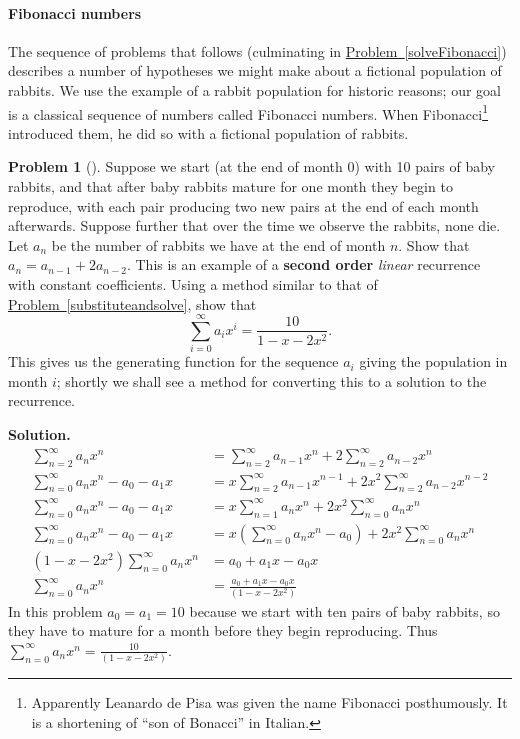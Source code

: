 \documentclass[10pt,]{book}
\newcommand{\terminology}[1]{\textbf{#1}}
\theoremstyle{plain}
\theoremstyle{definition}
\newtheorem{activity}[project]{Problem}
\theoremstyle{definition}
\numberwithin{equation}{chapter}
\newcommand{\amp}{&}
\begin{document}
\paragraph[{Fibonacci numbers}]{Fibonacci numbers}\hypertarget{paragraphs-7}{}
The sequence of problems that follows (culminating in \hyperref[solveFibonacci]{Problem~\ref{solveFibonacci}}) describes a number of hypotheses we might make about a fictional population of rabbits. We use the example of a rabbit population for historic reasons; our goal is a classical sequence of numbers called Fibonacci numbers. When Fibonacci\footnote{Apparently Leanardo de Pisa was given the name Fibonacci posthumously. It is a shortening of ``son of Bonacci'' in Italian.\label{fn-14}} introduced them, he did so with a fictional population of rabbits.%
\begin{activity}[]\label{secondorderintroduction}
Suppose we start (at the end of month 0) with 10 pairs of baby rabbits, and that after baby rabbits mature for one month they begin to reproduce, with each pair producing two new pairs at the end of each month afterwards. Suppose further that over the time we observe the rabbits, none die. Let \(a_n\) be the number of rabbits we have at the end of month \(n\). Show that \(a_n=a_{n-1} + 2a_{n-2}\). This is an example of a \terminology{second order} \emph{linear} recurrence with constant coefficients. Using a method similar to that of \hyperref[substituteandsolve]{Problem~\ref{substituteandsolve}}, show that%
\begin{equation*}
\sum_{i=0}^\infty a_ix^i = \frac{10}{1-x-2x^2}.
\end{equation*}
This gives us the generating function for the sequence \(a_i\) giving the population in month \(i\); shortly we shall see a method for converting this to a solution to the recurrence.%
\par\medskip\noindent%
\textbf{Solution.}\quad %
\begin{align*}
\sum_{n=2}^\infty a_nx^n \amp= \sum_{n=2}^\infty a_{n-1}x^n +
2\sum_{n=2}^\infty a_{n-2}x^n\\
\sum_{n=0}^\infty a_nx^n -a_0-a_1x  \amp= x\sum_{n=2}^\infty a_{n-1}x^{n-1} +
2x^2\sum_{n=2}^\infty a_{n-2}x^{n-2}\\
\sum_{n=0}^\infty a_nx^n -a_0-a_1x \amp= x\sum_{n=1}^\infty a_{n}x^{n} +
2x^2\sum_{n=0}^\infty a_{n}x^n\\
\sum_{n=0}^\infty a_nx^n -a_0-a_1x \amp= x\left(\sum_{n=0}^\infty
a_{n}x^{n}-a_0\right) + 2x^2\sum_{n=0}^\infty a_{n}x^n\\
(1-x-2x^2)\sum_{n=0}^\infty a_nx^n \amp= a_0+a_1x-a_0x\\
\sum_{n=0}^\infty a_nx^n \amp= \frac{a_0+a_1x-a_0x}{(1-x-2x^2)}
\end{align*}
In this problem \(a_0=a_1=10\) because we start with ten pairs of baby rabbits, so they have to mature for a month before they begin reproducing. Thus \(\displaystyle\sum_{n=0}^\infty a_nx^n = \frac{10}{(1-x-2x^2)}\).%
\end{activity}
\end{document}
